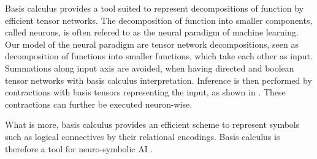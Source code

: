 
Basis calculus provides a tool suited to represent decompositions of function by efficient tensor networks.
The decomposition of function into smaller components, called neurons, is often refered to as the neural paradigm of machine learning.
Our model of the neural paradigm are tensor network decompositions, seen as decomposition of functions into smaller functions, which take each other as input.
Summations along input axis are avoided, when having directed and boolean tensor networks with basis calculus interpretation.
Inference is then performed by contractions with basis tensors representing the input, as shown in .
These contractions can further be executed neuron-wise.

What is more, basis calculus provides an efficient scheme to represent symbols such as logical connectives by their relational encodings.
Basis calculus is therefore a tool for neuro-symbolic AI \cite{garcez_neural-symbolic_2019, sarker_neuro-symbolic_2022, marra_statistical_2024}.



